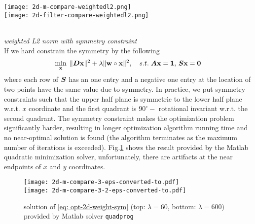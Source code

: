 \begin{comment}
\begin{minipage}{.9\textwidth}
\centering
\texttt{[image: 2d-m-compare-2-1-eps-converted-to.pdf]}\\
\texttt{[image: 2d-filter-compare-2-1-eps-converted-to.pdf]}
\captionof{figure}{result of \eqref{eq: opt-2d-weight} $\mhat{0}$ ($\lambda = 60$), target $\m{0}$ and their difference, Top: frequency domain, Bottom: time domain}
\label{fig: 2d-compare-2}
\end{minipage}
\end{comment}
\vspace*{2em}
\begin{minipage}{.9\textwidth}
\centering
\texttt{[image: 2d-m-compare-weightedl2.png]}\\
\texttt{[image: 2d-filter-compare-weightedl2.png]}
\label{fig: 2d-compare-2.2}
\end{minipage}
\\[1em]
{\it weighted L2 norm with symmetry constraint}\\
If we hard constrain the symmetry by the following
\begin{align}
\min_{\mathbf{x}}\; \Vert \boldsymbol{D}\mathbf{x}\Vert^2 + \lambda\Vert \mathbf{w}\circ\mathbf{x}\Vert^2,\quad s.t. \; \boldsymbol{A}\mathbf{x} = \mathbf{1},\,\boldsymbol{S}\mathbf{x} = \mathbf{0} \label{eq: opt-2d-weight-sym}
\end{align}
where each row of $\boldsymbol{S}$ has an one entry and a negative one entry at the location of two points have the same value due to symmetry. In practice, we put symmetry constraints such that the upper half plane is symmetric to the lower half plane w.r.t. $x$ coordinate and the first quadrant is $90^{\circ}-$ rotational invariant w.r.t. the second quadrant. The symmetry constraint makes the optimization problem significantly harder, resulting in longer optimization algorithm running time and no near-optimal solution is found (the algorithm terminates as the maximum number of iterations is exceeded). Fig.\ref{fig: 2d-compare-3} shows the result provided by the Matlab quadratic minimization solver, unfortunately, there are artifacts at the near endpoints of $x$ and $y$ coordinates.
\begin{figure}[h]
\texttt{[image: 2d-m-compare-3-eps-converted-to.pdf]}\\
\texttt{[image: 2d-m-compare-3-2-eps-converted-to.pdf]}
\caption{solution of \eqref{eq: opt-2d-weight-sym} (top: $\lambda=60$, bottom: $\lambda=600$) provided by Matlab solver \texttt{quadprog}}
\label{fig: 2d-compare-3}
\end{figure}
